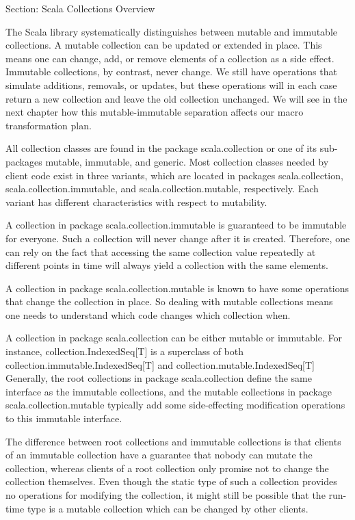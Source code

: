 Section: Scala Collections Overview

The Scala library systematically distinguishes between mutable and immutable
collections. A mutable collection can be updated or extended in place. This
means one can change, add, or remove elements of a collection as a side effect.
Immutable collections, by contrast, never change. We still have operations
that simulate additions, removals, or updates, but these operations will in each
case return a new collection and leave the old collection unchanged. We will see
in the next chapter how this mutable-immutable separation affects our macro
transformation plan.

All collection classes are found in the package scala.collection or one of its
sub-packages mutable, immutable, and generic. Most collection classes needed by
client code exist in three variants, which are located in packages
scala.collection, scala.collection.immutable, and scala.collection.mutable,
respectively. Each variant has different characteristics with respect to
mutability.

A collection in package scala.collection.immutable is guaranteed to be immutable
for everyone. Such a collection will never change after it is created.
Therefore, one can rely on the fact that accessing the same collection value
repeatedly at different points in time will always yield a collection with the
same elements.

A collection in package scala.collection.mutable is known to have some
operations that change the collection in place. So dealing with mutable
collections means one needs to understand which code changes which collection
when.

A collection in package scala.collection can be either mutable or immutable. For
instance, collection.IndexedSeq[T] is a superclass of both
collection.immutable.IndexedSeq[T] and collection.mutable.IndexedSeq[T]
Generally, the root collections in package scala.collection define the same
interface as the immutable collections, and the mutable collections in package
scala.collection.mutable typically add some side-effecting modification
operations to this immutable interface.

The difference between root collections and immutable collections is that
clients of an immutable collection have a guarantee that nobody can mutate the
collection, whereas clients of a root collection only promise not to change the
collection themselves. Even though the static type of such a collection provides
no operations for modifying the collection, it might still be possible that the
run-time type is a mutable collection which can be changed by other clients.

